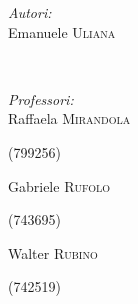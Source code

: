 \begin{titlepage}

\begin{minipage}{0.4\textwidth}
\begin{flushleft} \large
\emph{Autori:}\\
Emanuele \textsc{Uliana} %
\end{flushleft}
\end{minipage}
~
\begin{minipage}{0.4\textwidth}
\begin{flushright} \large
\emph{Professori:} \\
Raffaela \textsc{Mirandola} %
\end{flushright}
\end{minipage}
\begin{minipage}{0.83\textwidth}
\begin{flushleft} \large
\vspace{0,1cm}
\textsc{(799256)} %
\end{flushleft}
\end{minipage}
\begin{minipage}{0.83\textwidth}
\begin{flushleft} \large
\vspace{0,1cm}
Gabriele \textsc{Rufolo} %
\end{flushleft}
\end{minipage}
\begin{minipage}{0.83\textwidth}
\begin{flushleft} \large
\vspace{0,1cm}
\textsc{(743695)} %
\end{flushleft}
\end{minipage}
\begin{minipage}{0.83\textwidth}
\begin{flushleft} \large
\vspace{0,1cm}
Walter \textsc{Rubino} %
\end{flushleft}
\end{minipage}
\begin{minipage}{0.83\textwidth}
\begin{flushleft} \large
\vspace{0,1cm}
\textsc{(742519)} %
\end{flushleft}
\end{minipage}\\[1cm]





\end{titlepage}
